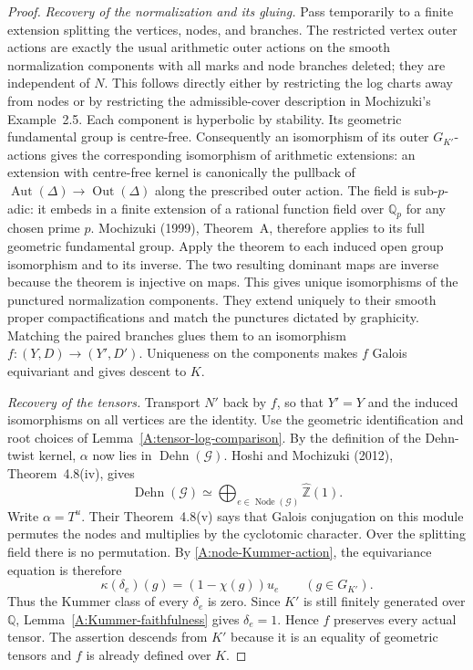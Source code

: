 \begin{proof}
\emph{Recovery of the normalization and its gluing.}
Pass temporarily to a finite extension splitting the vertices, nodes,
and branches. The restricted vertex outer actions are exactly the
usual arithmetic outer actions on the smooth normalization components
with all marks and node branches deleted; they are independent of
$N$. This follows directly either by restricting the log charts away
from nodes or by restricting the admissible-cover description in
Mochizuki's Example~2.5. Each component is hyperbolic by stability.
Its geometric fundamental group is centre-free. Consequently an
isomorphism of its outer $G_{K'}$-actions gives the corresponding
isomorphism of arithmetic extensions: an extension with centre-free
kernel is canonically the pullback of
$\operatorname{Aut}(\Delta)\to\operatorname{Out}(\Delta)$
along the prescribed outer action.
The field is sub-$p$-adic: it embeds in a finite extension of a
rational function field over $\mathbb Q_p$ for any chosen prime $p$.
Mochizuki (1999), Theorem~A, therefore applies to its full geometric
fundamental group. Apply the theorem to each induced open group
isomorphism and to its inverse. The two resulting dominant maps are
inverse because the theorem is injective on maps. This gives unique
isomorphisms of the punctured normalization components. They extend
uniquely to their smooth proper compactifications and match the
punctures dictated by graphicity. Matching the paired branches glues
them to an isomorphism $f:(Y,D)\to(Y',D')$. Uniqueness on the components
makes $f$ Galois equivariant and gives descent to $K$.

\emph{Recovery of the tensors.}
Transport $N'$ back by $f$, so that $Y'=Y$ and the induced
isomorphisms on all vertices are the identity. Use the geometric
identification and root choices of
Lemma~\ref{A:tensor-log-comparison}. By the definition of the
Dehn-twist kernel, $\alpha$ now lies in
$\operatorname{Dehn}(\mathcal G)$. Hoshi and Mochizuki (2012),
Theorem~4.8(iv), gives
\[
 \operatorname{Dehn}(\mathcal G)
   \simeq\bigoplus_{e\in\operatorname{Node}(\mathcal G)}
                 \widehat{\mathbb Z}(1).
\]
Write $\alpha=T^u$. Their Theorem~4.8(v) says that Galois conjugation
on this module permutes the nodes and multiplies by the cyclotomic
character. Over the splitting field there is no permutation. By
\eqref{A:node-Kummer-action}, the equivariance equation is therefore
\[
 \kappa(\delta_e)(g)=(1-\chi(g))u_e\qquad(g\in G_{K'}).
\]
Thus the Kummer class of every $\delta_e$ is zero. Since $K'$ is still
finitely generated over $\mathbb Q$, Lemma~\ref{A:Kummer-faithfulness}
gives $\delta_e=1$. Hence $f$ preserves every actual tensor.
The assertion descends from $K'$ because it is an equality of
geometric tensors and $f$ is already defined over $K$.


\end{proof}
